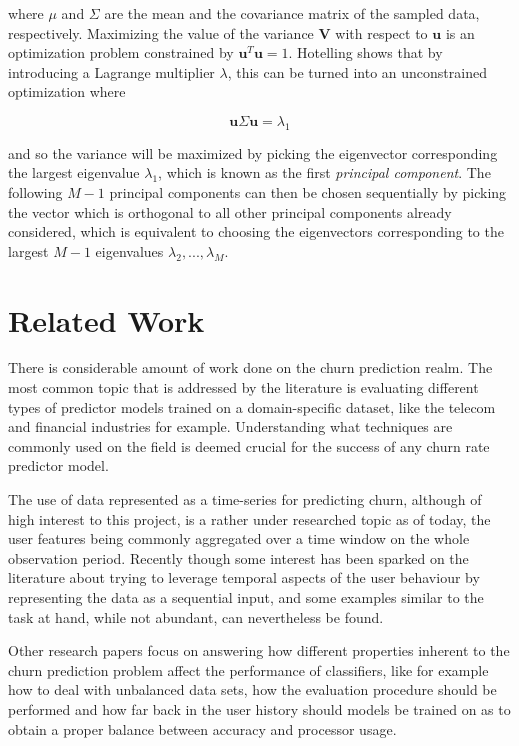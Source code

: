 \documentclass{kththesis}
\begin{document}
where $\mu$ and $\Sigma$ are the mean and the covariance matrix of the sampled data, respectively. Maximizing the value of the variance $\mathbf{V}$ with respect to $\mathbf{u}$ is an optimization problem constrained by $\mathbf{u}^T \mathbf{u}=1$. Hotelling\citep{hotelling1933analysis} shows that by introducing a Lagrange multiplier $\lambda$, this can be turned into an unconstrained optimization where

\begin{equation}
\mathbf{u}\Sigma\mathbf{u} = \lambda_1
\end{equation}
	
and so the variance will be maximized by picking the eigenvector corresponding the largest eigenvalue $\lambda_1$, which is known as the first \emph{principal component}. The following $M-1$ principal components can then be chosen sequentially by picking the vector which is orthogonal to all other principal components already considered, which is equivalent to choosing the eigenvectors corresponding to the largest $M-1$ eigenvalues $\lambda_2,..., \lambda_M$.

\chapter{Related Work}
\label{cha:related_work}

There is considerable amount of work done on the churn prediction realm. The most common topic that is addressed by the literature is evaluating different types of predictor models trained on a domain-specific dataset, like the telecom and financial industries for example. Understanding what techniques are commonly used on the field is deemed crucial for the success of any churn rate predictor model.

The use of data represented as a time-series for predicting churn, although of high interest to this project, is a rather under researched topic as of today, the user features being commonly aggregated over a time window on the whole observation period. Recently though some interest has been sparked on the literature about trying to leverage temporal aspects of the user behaviour by representing the data as a sequential input, and some examples similar to the task at hand, while not abundant, can nevertheless be found. 

Other research papers focus on answering how different properties inherent to the churn prediction problem affect the performance of classifiers, like for example how to deal with unbalanced data sets, how the evaluation procedure should be performed and how far back in the user history should models be trained on as to obtain a proper balance between accuracy and processor usage.  
\end{document}
